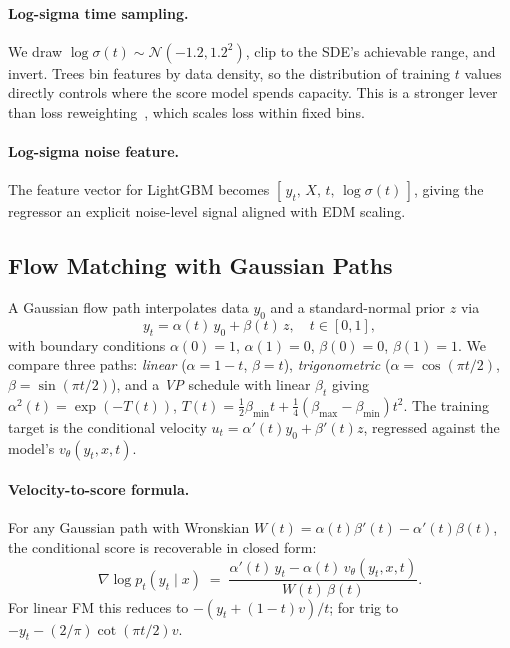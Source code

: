\documentclass{uai2026}
\newcommand{\Norm}{\mathcal{N}}
\begin{document}
\paragraph{Log-sigma time sampling.} We draw $\log\sigma(t) \sim \Norm(-1.2, 1.2^2)$, clip to the SDE's achievable range, and invert. Trees bin features by data density, so the distribution of training $t$ values directly controls where the score model spends capacity. This is a stronger lever than loss reweighting~\citep{hang2023minsnr}, which scales loss within fixed bins.

\paragraph{Log-sigma noise feature.} The feature vector for LightGBM becomes $[\,y_t,\,X,\,t,\,\log\sigma(t)\,]$, giving the regressor an explicit noise-level signal aligned with EDM scaling.

\subsection{Flow Matching with Gaussian Paths}\label{sec:fm}
A Gaussian flow path interpolates data $y_0$ and a standard-normal prior $z$ via
\begin{equation}\label{eq:path}
y_t = \alpha(t)\, y_0 + \beta(t)\, z, \quad t \in [0,1],
\end{equation}
with boundary conditions $\alpha(0)=1$, $\alpha(1)=0$, $\beta(0)=0$, $\beta(1)=1$. We compare three paths: \emph{linear} ($\alpha = 1-t$, $\beta = t$), \emph{trigonometric} ($\alpha = \cos(\pi t/2)$, $\beta = \sin(\pi t /2)$), and a \emph{VP} schedule with linear $\beta_t$ giving $\alpha^2(t) = \exp(-T(t))$, $T(t) = \tfrac{1}{2}\beta_{\min} t + \tfrac{1}{4}(\beta_{\max} - \beta_{\min}) t^2$. The training target is the conditional velocity $u_t = \alpha'(t) y_0 + \beta'(t) z$, regressed against the model's $v_\theta(y_t, x, t)$.

\paragraph{Velocity-to-score formula.} For any Gaussian path with Wronskian $W(t) = \alpha(t) \beta'(t) - \alpha'(t) \beta(t)$, the conditional score is recoverable in closed form:
\begin{equation}\label{eq:score}
\nabla \log p_t(y_t \mid x) \;=\; \frac{\alpha'(t)\, y_t - \alpha(t)\, v_\theta(y_t, x, t)}{W(t)\,\beta(t)}.
\end{equation}
For linear FM this reduces to $-(y_t + (1-t) v)/t$; for trig to $-y_t - (2/\pi)\cot(\pi t/2) v$.
\end{document}
